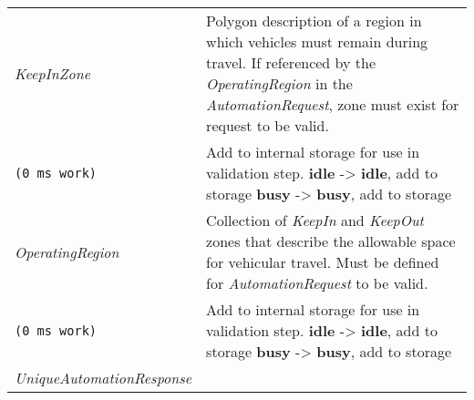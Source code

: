 \begin{longtable}[c]{@{}ll@{}}
\begin{minipage}[t]{0.29\columnwidth}\raggedright\strut
\emph{KeepInZone}
\strut\end{minipage} &
\begin{minipage}[t]{0.65\columnwidth}\raggedright\strut
Polygon description of a region in which vehicles must remain during
travel. If referenced by the \emph{OperatingRegion} in the
\emph{AutomationRequest}, zone must exist for request to be valid.
\strut\end{minipage}\tabularnewline
\begin{minipage}[t]{0.29\columnwidth}\raggedright\strut
\begin{verbatim}
(0 ms work)
\end{verbatim}
\strut\end{minipage} &
\begin{minipage}[t]{0.65\columnwidth}\raggedright\strut
Add to internal storage for use in validation step. \textbf{idle}
-\textgreater{} \textbf{idle}, add to storage \textbf{busy}
-\textgreater{} \textbf{busy}, add to storage
\strut\end{minipage}\tabularnewline
\begin{minipage}[t]{0.29\columnwidth}\raggedright\strut
\emph{OperatingRegion}
\strut\end{minipage} &
\begin{minipage}[t]{0.65\columnwidth}\raggedright\strut
Collection of \emph{KeepIn} and \emph{KeepOut} zones that describe the
allowable space for vehicular travel. Must be defined for
\emph{AutomationRequest} to be valid.
\strut\end{minipage}\tabularnewline
\begin{minipage}[t]{0.29\columnwidth}\raggedright\strut
\begin{verbatim}
(0 ms work)
\end{verbatim}
\strut\end{minipage} &
\begin{minipage}[t]{0.65\columnwidth}\raggedright\strut
Add to internal storage for use in validation step. \textbf{idle}
-\textgreater{} \textbf{idle}, add to storage \textbf{busy}
-\textgreater{} \textbf{busy}, add to storage
\strut\end{minipage}\tabularnewline
\begin{minipage}[t]{0.29\columnwidth}\raggedright\strut
\emph{UniqueAutomationResponse}
\strut\end{minipage} &
\begin{minipage}[t]{0.65\columnwidth}\raggedright\strut

\end{minipage}
\end{longtable}
